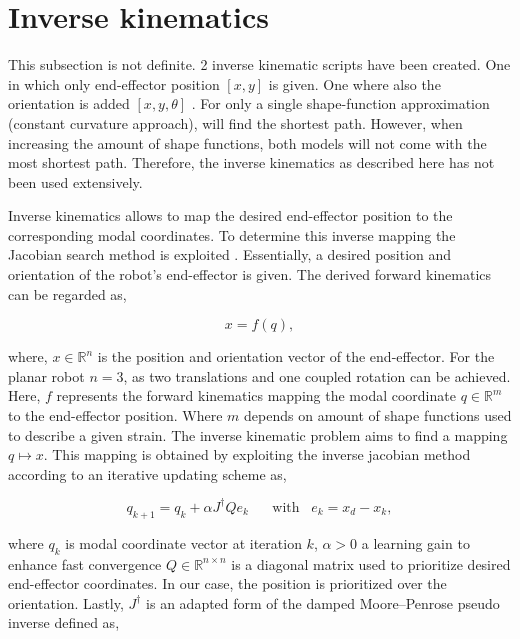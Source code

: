 \section{Inverse kinematics}
\label{app:chap2}

This subsection is not definite. 2 inverse kinematic scripts have been created. One in which only end-effector position $[x,y]$ is given. One where also the orientation is added $[x,y,\theta]$ . For only a single shape-function approximation (constant curvature approach), will find the shortest path. However, when increasing the amount of shape functions, both models will not come with the most shortest path. Therefore, the inverse kinematics as described here has not been used extensively.


Inverse kinematics allows to map the desired end-effector position to the corresponding modal coordinates. To determine this inverse mapping the Jacobian search method is exploited \cite{JacobianInverse}. Essentially, a desired position and orientation of the robot's end-effector is given. The derived forward kinematics can be regarded as,

\begin{equation}
    x = f(q),
\end{equation}

where, $x \in \mathbb{R}^n$ is the position and orientation vector of the end-effector. For the planar robot $n = 3$, as two translations and one coupled rotation can be achieved. Here, $f$ represents the forward kinematics mapping the modal coordinate $q \in \mathbb{R}^m$ to the end-effector position. Where $m$ depends on amount of shape functions used to describe a given strain. The inverse kinematic problem aims to find a mapping $q\mapsto x$. This mapping is obtained by exploiting the inverse jacobian method according to an iterative updating scheme as,

\begin{equation}
    q_{k+1} = q_k + \alpha J^\dagger Q e_k \hspace{20pt} \text{with} \hspace{10pt}  e_k = x_d - x_k,
    \label{eq2:qupdate}
\end{equation}

where $q_k$ is modal coordinate vector at iteration $k$, $\alpha > 0$ a learning gain to enhance fast convergence $Q \in \mathbb{R}^{n\times n}$ is a diagonal matrix used to prioritize desired end-effector coordinates. In our case, the position is prioritized over the orientation. Lastly, $J^\dagger$ is an adapted form of the damped Moore–Penrose pseudo inverse defined as,

